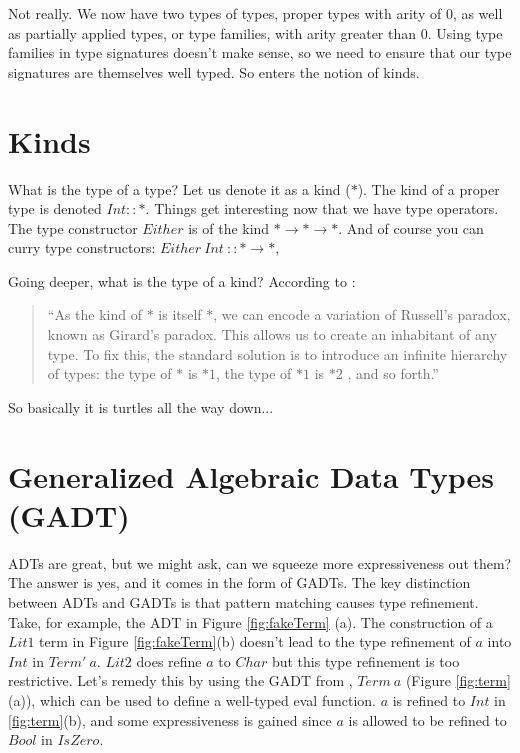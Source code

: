 Not really. We now have two types of types, proper types with arity of 0, as well as partially applied types, or type families, with arity greater than 0. Using type families in type signatures doesn't make sense, so we need to ensure that our type signatures are themselves well typed. So enters the notion of kinds.

\section{Kinds}
What is the type of a type? Let us denote it as a kind ($\ast$). The kind of a proper type is denoted $Int :: \ast $. Things get interesting now that we have type operators. The type constructor $Either$ is of the kind $\ast \rightarrow \ast \rightarrow \ast $. And of course you can curry type constructors: $Either\ Int\ :: \ast \rightarrow \ast $,

Going deeper, what is the type of a kind? According to \cite{lambdaPi}:

\begin{quote}
``As the kind of $\ast$ is itself $\ast$, we can encode a variation of Russell's paradox, known as Girard’s paradox. This allows us to create an inhabitant of any type. To fix this, the standard solution is to introduce an infinite hierarchy of types: the type of $\ast$ is $\ast1$, the type of $\ast1$ is $\ast2$ , and so forth.''
\end{quote}

So basically it is turtles all the way down...

\section{Generalized Algebraic Data Types (GADT)}
ADTs are great, but we might ask, can we squeeze more expressiveness out them? The answer is yes, and it comes in the form of GADTs.  The key distinction between ADTs and GADTs is that pattern matching causes type refinement. Take, for example, the ADT in Figure \ref{fig:fakeTerm} (a). The construction of a $Lit1$ term in Figure \ref{fig:fakeTerm}(b) doesn't lead to the type refinement of $a$ into $Int$ in $Term'\ a$. $Lit2$ does refine $a$ to $Char$ but this type refinement is too restrictive. Let's remedy this by using the GADT from \cite{haskellGADT}, $Term\ a$ (Figure \ref{fig:term} (a)), which can be used to define a well-typed eval function.  $a$ is refined to $Int$ in \ref{fig:term}(b), and some expressiveness is gained since $a$ is allowed to be refined to $Bool$ in $IsZero$.

